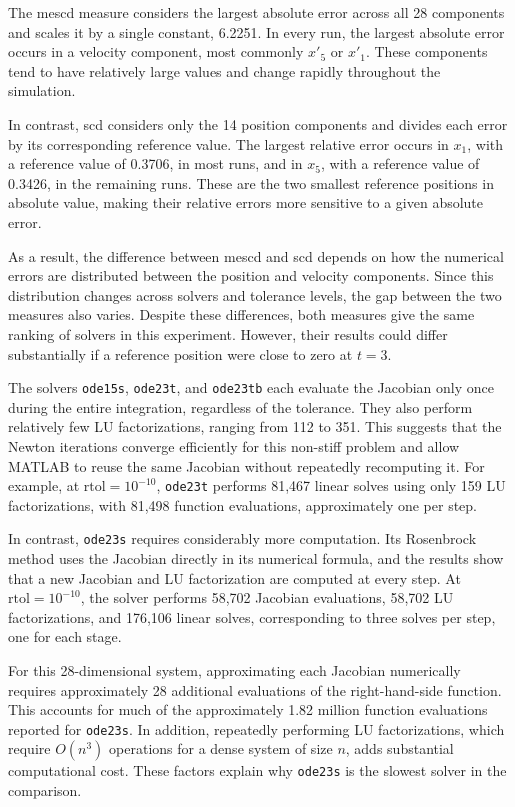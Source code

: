 \documentclass[11pt]{article}
\begin{document}
The mescd measure considers the largest absolute error across
all 28 components and scales it by a single constant, 6.2251.
In every run, the largest absolute error occurs in a velocity
component, most commonly $x'_5$ or $x'_1$. These components
tend to have relatively large values and change rapidly
throughout the simulation.

In contrast, scd considers only the 14 position components
and divides each error by its corresponding reference value.
The largest relative error occurs in $x_1$, with a reference
value of 0.3706, in most runs, and in $x_5$, with a reference
value of 0.3426, in the remaining runs. These are the two
smallest reference positions in absolute value, making their
relative errors more sensitive to a given absolute error.

As a result, the difference between mescd and scd depends
on how the numerical errors are distributed between the
position and velocity components. Since this distribution
changes across solvers and tolerance levels, the gap between
the two measures also varies. Despite these differences,
both measures give the same ranking of solvers in this
experiment. However, their results could differ substantially
if a reference position were close to zero at $t=3$.


The solvers \texttt{ode15s}, \texttt{ode23t}, and
\texttt{ode23tb} each evaluate the Jacobian only once
during the entire integration, regardless of the tolerance.
They also perform relatively few LU factorizations, ranging
from 112 to 351. This suggests that the Newton iterations
converge efficiently for this non-stiff problem and allow
MATLAB to reuse the same Jacobian without repeatedly
recomputing it. For example, at $\mathrm{rtol}=10^{-10}$,
\texttt{ode23t} performs 81,467 linear solves using only
159 LU factorizations, with 81,498 function evaluations,
approximately one per step.

In contrast, \texttt{ode23s} requires considerably more
computation. Its Rosenbrock method uses the Jacobian directly
in its numerical formula, and the results show that a new
Jacobian and LU factorization are computed at every step.
At $\mathrm{rtol}=10^{-10}$, the solver performs 58,702
Jacobian evaluations, 58,702 LU factorizations, and
176,106 linear solves, corresponding to three solves
per step, one for each stage.

For this 28-dimensional system, approximating each Jacobian
numerically requires approximately 28 additional evaluations
of the right-hand-side function. This accounts for much of
the approximately 1.82 million function evaluations reported
for \texttt{ode23s}. In addition, repeatedly performing LU
factorizations, which require $O(n^3)$ operations for a
dense system of size $n$, adds substantial computational cost.
These factors explain why \texttt{ode23s} is the
slowest solver in the comparison.
\end{document}
